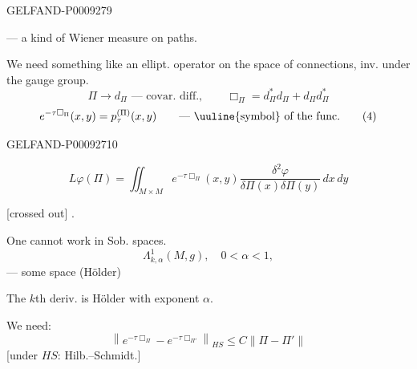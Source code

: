 \begin{GelfandAdjacentEvidence}{GELFAND-P000927}{9}


 --- a kind of Wiener measure on paths.

We need something like an ellipt. operator on the space of connections, inv. under the gauge group.
\[
 \Pi\to d_\Pi\text{ --- covar. diff.},\qquad
 \Box_\Pi=d_\Pi^*d_\Pi+d_\Pi d_\Pi^*
\]
\begin{equation*}
 e^{-\tau\Box_\Pi}(x,y)=p_\tau^{(\Pi)}(x,y)
 \qquad\text{--- \uuline{symbol} of the func.}
 \tag{4}
\end{equation*}
\end{GelfandAdjacentEvidence}
\begin{GelfandAdjacentEvidence}{GELFAND-P000927}{10}

\begin{equation*}
 L\varphi(\Pi)=\iint_{M\times M} e^{-\tau\Box_\Pi}(x,y)
 \frac{\delta^2\varphi}{\delta\Pi(x)\delta\Pi(y)}\,dx\,dy
 \tag{5}
\end{equation*}

[crossed out] .
\end{GelfandAdjacentEvidence}


One cannot work in Sob. spaces.
\begin{equation*}
 \Lambda^1_{k,\alpha}(M,g),\quad 0<\alpha<1,
 \tag{6}
\end{equation*}
--- some space (Hölder)

The $k$th deriv. is Hölder with exponent $\alpha$.

We need:
\begin{equation*}
 \left\|e^{-\tau\Box_\Pi}-e^{-\tau\Box_{\Pi'}}\right\|_{HS}
 \le C\|\Pi-\Pi'\|
 \tag{7}
\end{equation*}
[under \(HS\): Hilb.–Schmidt.]


